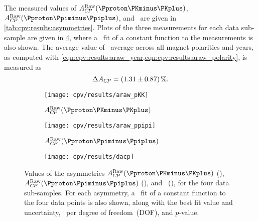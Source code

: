 The measured values of $\ARaw(\pKK)$, $\ARaw(\ppipi)$, and \dACP\ are given in 
\cref{tab:cpv:results:asymmetries}.
Plots of the three measurements for each data sub-sample are given in 
\cref{fig:cpv:results:asymmetries}, where a \chisq\ fit of a constant function 
to the measurements is also shown.
The average value of \dACP\ average across all magnet polarities and years, as 
computed with \cref{eqn:cpv:results:araw_year,eqn:cpv:results:araw_polarity}, 
is measured as
\begin{equation*}
  \dACP = \deltaACP.
\end{equation*}

\begin{table}
  \centering
  \caption{%
    Measured asymmetries for each data sub-sample and combination of 
    sub-samples.
    The computation of the combinations, ``2011 + 2012'' and ``Average'', is 
    defined in \cref{chap:cpv:results:combination}.
  }
  \label{tab:results:asymmetries}
    
\end{table}

\begin{figure}
  \begin{subfigure}[b]{0.5\textwidth}
    \texttt{[image: cpv/results/araw\_pKK]}
    \caption{$\ARaw(\pKK)$}
    \label{fig:cpv:results:asymmetries:pKK}
  \end{subfigure}
  \begin{subfigure}[b]{0.5\textwidth}
    \texttt{[image: cpv/results/araw\_ppipi]}
    \caption{$\ARaw(\ppipi)$}
    \label{fig:cpv:results:asymmetries:ppipi}
  \end{subfigure}

  \vspace{0.5cm}

  \begin{subfigure}[b]{\textwidth}
    \centering
    \texttt{[image: cpv/results/dacp]}
    \caption{\dACP}
    \label{fig:cpv:results:asymmetries:dacp}
  \end{subfigure}
  \caption{%
    Values of the asymmetries $\ARaw(\pKK)$ 
    (), $\ARaw(\ppipi)$ 
    (), and \dACP\ 
    (), for the four data 
    sub-samples.
    For each asymmetry, a \chisq\ fit of a constant function to the four data 
    points is also shown, along with the best fit value and uncertainty, 
    \chisq\ per degree of freedom~(DOF), and $p$-value.
  }
  \label{fig:cpv:results:asymmetries}
\end{figure}

